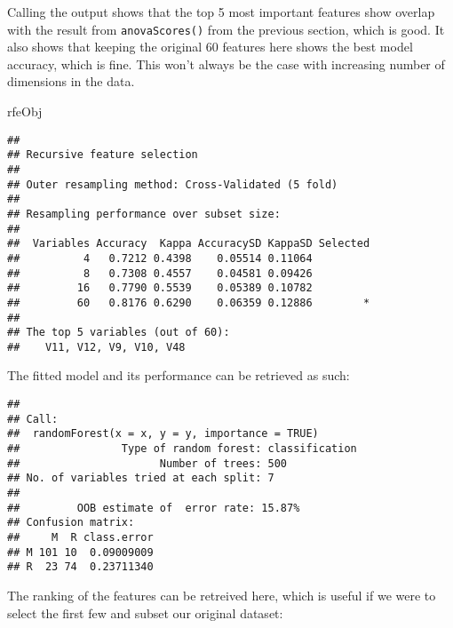 \documentclass[
]{book}
\newenvironment{Shaded}{\begin{snugshade}}{\end{snugshade}}
\newcommand{\NormalTok}[1]{#1}
\newcommand{\SpecialCharTok}[1]{\textcolor[rgb]{0.00,0.00,0.00}{#1}}
\begin{document}
Calling the output shows that the top 5 most important features show overlap with the result from \texttt{anovaScores()} from the previous section, which is good. It also shows that keeping the original 60 features here shows the best model accuracy, which is fine. This won't always be the case with increasing number of dimensions in the data.

\begin{Shaded}
\begin{Highlighting}[]
\NormalTok{rfeObj}
\end{Highlighting}
\end{Shaded}

\begin{verbatim}
## 
## Recursive feature selection
## 
## Outer resampling method: Cross-Validated (5 fold) 
## 
## Resampling performance over subset size:
## 
##  Variables Accuracy  Kappa AccuracySD KappaSD Selected
##          4   0.7212 0.4398    0.05514 0.11064         
##          8   0.7308 0.4557    0.04581 0.09426         
##         16   0.7790 0.5539    0.05389 0.10782         
##         60   0.8176 0.6290    0.06359 0.12886        *
## 
## The top 5 variables (out of 60):
##    V11, V12, V9, V10, V48
\end{verbatim}

The fitted model and its performance can be retrieved as such:

\begin{Shaded}
\end{Shaded}

\begin{verbatim}
## 
## Call:
##  randomForest(x = x, y = y, importance = TRUE) 
##                Type of random forest: classification
##                      Number of trees: 500
## No. of variables tried at each split: 7
## 
##         OOB estimate of  error rate: 15.87%
## Confusion matrix:
##     M  R class.error
## M 101 10  0.09009009
## R  23 74  0.23711340
\end{verbatim}

The ranking of the features can be retreived here, which is useful if we were to select the first few and subset our original dataset:

\begin{Shaded}
\end{Shaded}
\end{document}
